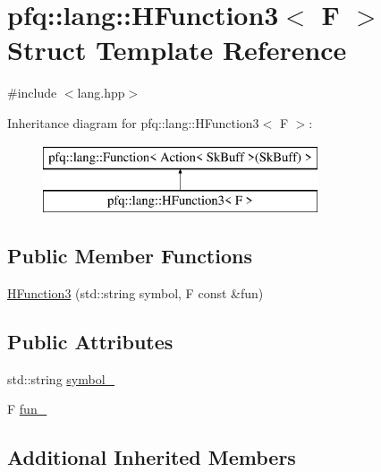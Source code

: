 \hypertarget{structpfq_1_1lang_1_1HFunction3}{\section{pfq\+:\+:lang\+:\+:H\+Function3$<$ F $>$ Struct Template Reference}
\label{structpfq_1_1lang_1_1HFunction3}
}


{\ttfamily \#include $<$lang.\+hpp$>$}

Inheritance diagram for pfq\+:\+:lang\+:\+:H\+Function3$<$ F $>$\+:\begin{figure}[H]
\begin{center}
\leavevmode
\includegraphics[height=2.000000cm]{structpfq_1_1lang_1_1HFunction3}
\end{center}
\end{figure}
\subsection*{Public Member Functions}
\begin{DoxyCompactItemize}
\item 
\hyperlink{structpfq_1_1lang_1_1HFunction3_a6389e0634347783a7230b29f44a73d78}{H\+Function3} (std\+::string symbol, F const \&fun)
\end{DoxyCompactItemize}
\subsection*{Public Attributes}
\begin{DoxyCompactItemize}
\item 
std\+::string \hyperlink{structpfq_1_1lang_1_1HFunction3_a94c96d3fa5856c5d3938151615dd27f6}{symbol\+\_\+}
\item 
F \hyperlink{structpfq_1_1lang_1_1HFunction3_ab43b8a2147510511384620cde7f6de35}{fun\+\_\+}
\end{DoxyCompactItemize}
\subsection*{Additional Inherited Members}


